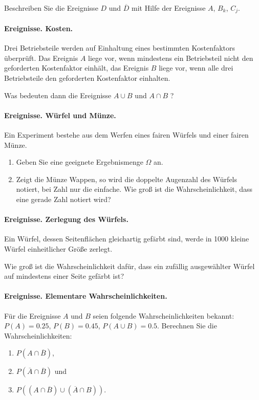 Beschreiben Sie die Ereignisse $D$ und $\overline{D}$ mit Hilfe der Ereignisse
$A$, $B_k$, $C_j$.


\paragraph{Ereignisse. Kosten.}
Drei Betriebsteile werden auf Einhaltung eines bestimmten
Kostenfaktors überprüft. Das Ereignis $A$ liege vor, wenn mindestens ein
Betriebsteil nicht den geforderten Kostenfaktor einhält, das Ereignis $B$ liege
vor, wenn alle drei Betriebsteile den geforderten Kostenfaktor einhalten.

Was bedeuten dann die Ereignisse $A\cup B$ und $A\cap B$ ?


\paragraph{Ereignisse. Würfel und Münze.}
Ein Experiment bestehe aus dem Werfen eines fairen Würfels und einer fairen Münze.
\begin{enumerate}
    \item Geben Sie eine geeignete Ergebnismenge $\Omega$ an.
    \item Zeigt die Münze Wappen, so wird die doppelte Augenzahl des Würfels
        notiert, bei Zahl nur die einfache. Wie groß ist die
        Wahrscheinlichkeit, dass eine gerade Zahl notiert wird?
\end{enumerate}


\paragraph{Ereignisse. Zerlegung des Würfels.}
Ein Würfel, dessen Seitenflächen gleichartig gefärbt sind, werde in 1000
kleine Würfel einheitlicher Größe zerlegt.

Wie groß ist die Wahrscheinlichkeit dafür, dass ein zufällig ausgewählter
Würfel auf mindestens einer Seite gefärbt ist?


\paragraph{Ereignisse. Elementare Wahrscheinlichkeiten.}
Für die Ereignisse $A$ und $B$ seien folgende Wahrscheinlichkeiten bekannt:
$P(A)=0.25$, $P(B)=0.45$, $P(A\cup B)=0.5$. Berechnen Sie die
Wahrscheinlichkeiten:
\begin{enumerate}
    \item $P(A\cap\overline{B})$,
    \item $P(\overline{A}\cap\overline{B})$ und
    \item $P\left((A\cap\overline{B})\cup(\overline{A}\cap B)\right)$.
\end{enumerate}

